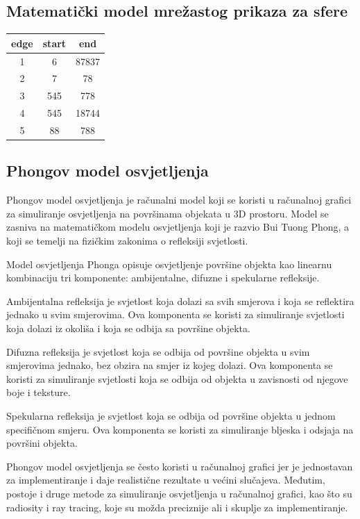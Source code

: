 \documentclass[a4paper,12pt]{article}
\begin{document}
    \subsection{Matematički model mrežastog prikaza za sfere}
\begin{flushleft}
    \begin{tabular}{||c | c | c ||} 
     \hline
     edge & start & end \\ [0.5ex] 
     \hline\hline
     1 & 6 & 87837  \\ 
     \hline
     2 & 7 & 78  \\
     \hline
     3 & 545 & 778  \\
     \hline
     4 & 545 & 18744 \\
     \hline
     5 & 88 & 788  \\ [1ex] 
     \hline
    \end{tabular}
    \end{flushleft}

\newpage
\subsection{Phongov model osvjetljenja}
Phongov model osvjetljenja je računalni model koji se koristi u računalnoj grafici za simuliranje osvjetljenja na površinama objekata u 3D prostoru. Model se zasniva na matematičkom modelu osvjetljenja koji je razvio Bui Tuong Phong, a koji se temelji na fizičkim zakonima o refleksiji svjetlosti.

Model osvjetljenja Phonga opisuje osvjetljenje površine objekta kao linearnu kombinaciju tri komponente: ambijentalne, difuzne i spekularne refleksije.

Ambijentalna refleksija je svjetlost koja dolazi sa svih smjerova i koja se reflektira jednako u svim smjerovima. Ova komponenta se koristi za simuliranje svjetlosti koja dolazi iz okoliša i koja se odbija sa površine objekta.

Difuzna refleksija je svjetlost koja se odbija od površine objekta u svim smjerovima jednako, bez obzira na smjer iz kojeg dolazi. Ova komponenta se koristi za simuliranje svjetlosti koja se odbija od objekta u zavisnosti od njegove boje i teksture.

Spekularna refleksija je svjetlost koja se odbija od površine objekta u jednom specifičnom smjeru. Ova komponenta se koristi za simuliranje bljeska i odsjaja na površini objekta.

Phongov model osvjetljenja se često koristi u računalnoj grafici jer je jednostavan za implementiranje i daje realistične rezultate u većini slučajeva. Međutim, postoje i druge metode za simuliranje osvjetljenja u računalnoj grafici, kao što su radiosity i ray tracing, koje su možda preciznije ali i skuplje za implementiranje.
\end{document}
